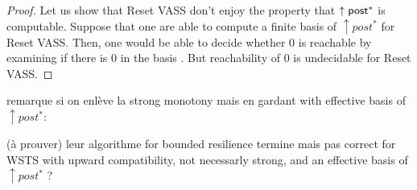 \begin{proof}
Let us show that Reset VASS don't enjoy the property that $\uparrow \textsf{post}^*$ is computable.
Suppose that one are able to compute a finite basis of $\uparrow post^*$ for Reset VASS. Then, one would be able to decide whether $0$ is reachable 
by examining if there is %
$0$ in the basis%
. But reachability of $0$  %
is undecidable for Reset VASS. 
\end{proof}


remarque si on enlève la strong monotony mais en gardant with effective basis of $\uparrow post^*$:


\begin{proposition}(à prouver)
 leur algorithme for {\sc bounded resilience} termine mais pas correct for WSTS with upward compatibility, not necessarly strong, and an effective basis of $\uparrow post^*$ ?
\end{proposition}

